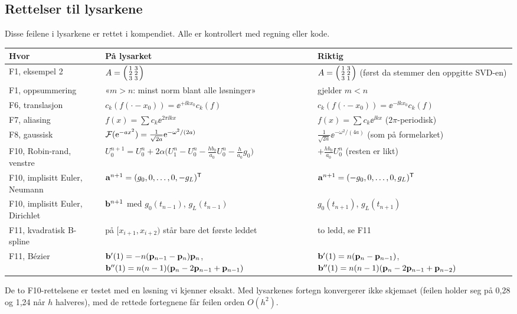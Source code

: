 \subsection{Rettelser til lysarkene}\label{sec:rettelser}
Disse feilene i lysarkene er rettet i kompendiet. Alle er kontrollert med regning eller kode.
\begin{center}
\small
\begin{tabularx}{\textwidth}{@{}l X X@{}}
\toprule
Hvor & På lysarket & Riktig \\
\midrule
F1, eksempel 2 & $A=\begin{psmallmatrix}1&3\\2&2\\3&3\end{psmallmatrix}$ & $A=\begin{psmallmatrix}1&3\\2&2\\3&1\end{psmallmatrix}$ (først da stemmer den oppgitte SVD-en) \\
F1, oppsummering & «$m>n$: minst norm blant alle løsninger» & gjelder $m<n$ \\
F6, translasjon & $c_k(f(\cdot-x_0))=\ee^{+\ii kx_0}c_k(f)$ & $c_k(f(\cdot-x_0))=\ee^{-\ii kx_0}c_k(f)$ \\
F7, aliasing & $f(x)=\sum c_k\ee^{2\pi\ii kx}$ & $f(x)=\sum c_k\ee^{\ii kx}$ ($2\pi$-periodisk) \\
F8, gaussisk & $\mathcal{F}(\mathrm{e}^{-ax^2})=\frac{1}{\sqrt{2a}}\mathrm{e}^{-\omega^2/(2a)}$ & $\frac{1}{\sqrt{2a}}\ee^{-\omega^2/(4a)}$ (som på formelarket) \\
F10, Robin-rand, venstre & $U_0^{n+1}=U_0^n+2\alpha\bigl(U_1^n-U_0^n-\tfrac{hb_0}{a_0}U_0^n-\tfrac h{a_0}g_0\bigr)$ & $+\tfrac{hb_0}{a_0}U_0^n$ (resten er likt) \\
F10, implisitt Euler, Neumann & $\mathbf{a}^{n+1}=(g_0,0,\dots,0,-g_L)^{\mathsf{T}}$ & $\mathbf{a}^{n+1}=(-g_0,0,\dots,0,g_L)^{\mathsf{T}}$ \\
F10, implisitt Euler, Dirichlet & $\mathbf{b}^{n+1}$ med $g_0(t_{n-1})$, $g_L(t_{n-1})$ & $g_0(t_{n+1})$, $g_L(t_{n+1})$ \\
F11, kvadratisk B-spline & på $[x_{i+1},x_{i+2})$ står bare det første leddet & to ledd, se F11 \\
F11, Bézier & $\mathbf{b}'(1)=-n(\mathbf{p}_{n-1}-\mathbf{p}_n)\mathbf{p}_n$, $\mathbf{b}''(1)=n(n-1)(\mathbf{p}_n-2\mathbf{p}_{n-1}+\mathbf{p}_{n-1})$ & $\mathbf{b}'(1)=n(\mathbf{p}_n-\mathbf{p}_{n-1})$, $\mathbf{b}''(1)=n(n-1)(\mathbf{p}_n-2\mathbf{p}_{n-1}+\mathbf{p}_{n-2})$ \\
\bottomrule
\end{tabularx}
\end{center}
De to F10-rettelsene er testet med en løsning vi kjenner eksakt. Med lysarkenes fortegn konvergerer ikke skjemaet (feilen holder seg på 0,28 og 1,24 når $h$ halveres), med de rettede fortegnene får feilen orden $O(h^2)$.

\clearpage
